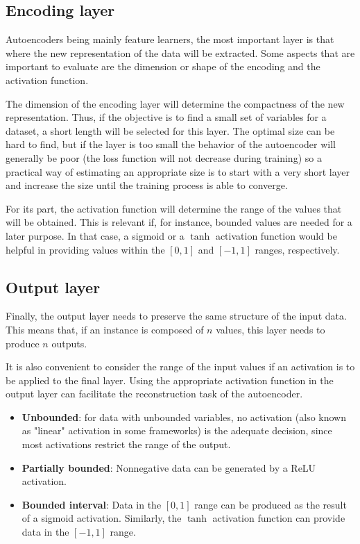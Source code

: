 \subsection{Encoding layer}

Autoencoders being mainly feature learners, the most important layer is that where the new representation of the data will be extracted. Some aspects that are important to evaluate are the dimension or shape of the encoding and the activation function.

The dimension of the encoding layer will determine the compactness of the new representation. Thus, if the objective is to find a small set of variables for a dataset, a short length will be selected for this layer. The optimal size can be hard to find, but if the layer is too small the behavior of the autoencoder will generally be poor (the loss function will not decrease during training) so a practical way of estimating an appropriate size is to start with a very short layer and increase the size until the training process is able to converge.

For its part, the activation function will determine the range of the values that will be obtained. This is relevant if, for instance, bounded values are needed for a later purpose. In that case, a sigmoid or a $\tanh$ activation function would be helpful in providing values within the $[0,1]$ and $[-1,1]$ ranges, respectively.

\subsection{Output layer}

Finally, the output layer needs to preserve the same structure of the input data. This means that, if an instance is composed of $n$ values, this layer needs to produce $n$ outputs.

It is also convenient to consider the range of the input values if an activation is to be applied to the final layer. 
Using the appropriate activation function in the output layer can facilitate the reconstruction task of the autoencoder. 
\begin{itemize}
    \item \textbf{Unbounded}: for data with unbounded variables, no activation (also known as "linear" activation in some frameworks) is the adequate decision, since most activations restrict the range of the output.
    \item \textbf{Partially bounded}: Nonnegative data can be generated by a ReLU activation.
    \item \textbf{Bounded interval}: Data in the $[0,1]$ range can be produced as the result of a sigmoid activation. Similarly, the $\tanh$ activation function can provide data in the $[-1,1]$ range.
\end{itemize}

